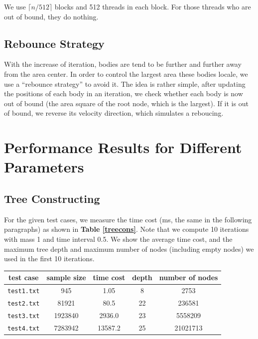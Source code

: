 \documentclass[11pt, a4paper]{article}
\makeatletter
\newcommand\tcaption{\def\@captype{table}\caption}
\newcommand{\tref}[1]{\textbf{Table \ref{#1}}}
\makeatother
\begin{document}
We use $\lceil n/512 \rceil$ blocks and 512 threads in each block. For those threads who are out of bound, they do nothing.

\subsection{Rebounce Strategy}

With the increase of iteration, bodies are tend to be further and further away from the area center. In order to control the largest area these bodies locale, we use a ``rebounce strategy'' to avoid it. The idea is rather simple, after updating the positions of each body in an iteration, we check whether each body is now out of bound (the area square of the root node, which is the largest). If it is out of bound, we reverse its velocity direction, which simulates a reboucing.

\section{Performance Results for Different Parameters}

\subsection{Tree Constructing}

For the given test cases, we measure the time cost (ms, the same in the following paragraphs) as shown in \tref{treecons}. Note that we compute 10 iterations with mass 1 and time interval 0.5. We show the average time cost, and the maximum tree depth and maximum number of nodes (including empty nodes) we used in the first 10 iterations.

\begin{center}
    \tcaption{Performance on different number of threads}\label{treecons}
    \begin{tabular}{ccccc}
        \toprule
        test case & sample size & time cost & depth & number of nodes \\
        \midrule
        \texttt{test1.txt} & 945 & 1.05 & 8 & 2753 \\
        \texttt{test2.txt} & 81921 & 80.5 & 22 & 236581 \\
        \texttt{test3.txt} & 1923840 & 2936.0 & 23 & 5558209 \\
        \texttt{test4.txt} & 7283942 & 13587.2 & 25 & 21021713 \\
        \bottomrule
    \end{tabular}
\end{center}
\end{document}
